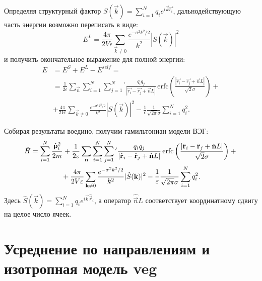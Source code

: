 Определяя структурный фактор $S (\vec{k}) = \sum_{i=1}^N q_i e^{i\vec{k} \vec{r_i}}$, дальнодействующую часть энергии возможно переписать в виде:
\begin{equation}
    \label{eq:jel:E_L_from_S}
    E^L = \frac{4\pi}{2V \epsilon} \sum_{\vec{k} \neq 0} \frac{e^{-\sigma^2 k^2 /2}}{k^2} | S (\vec{k}) |^2
\end{equation}
и получить окончательное выражение для полной энергии:
\begin{equation}
\label{eq:jel:total_energy_final}
\begin{aligned}
    E &= E^S + E^L - E^{self} = \\
    &= \frac{1}{2 \epsilon} \sum_{\vec{n}} \sum_{i=1}^N \sum_{j=1}^N {}^\prime \frac{q_i q_j}{|\vec{r_i} - \vec{r_j} + \vec{n}L|}\, \mathrm{erfc} \left( \frac{ |\vec{r_i} - \vec{r_j} + \vec{n}L| }{ \sqrt{2} \sigma } \right) + \\
    &+ \frac{4\pi}{2V \epsilon} \sum_{\vec{k} \neq 0} \frac{e^{-\sigma^2 k^2 / 2}}{k^2} | S (\vec{k}) |^2 - \frac{1}{\epsilon} \frac{1}{\sqrt{2\pi} \sigma} \sum_{i=1}^N q_i^2.
\end{aligned}
\end{equation}

Собирая результаты воедино, получим гамильтониан модели ВЭГ:
\begin{multline}
    \label{eq:jel:ham_final}
        \hat{H} = \sum\limits_{i=1}^{N} \cfrac{\hat{\vec{p}}_{i}^2}{2m}\, +
        \frac{1}{2 \epsilon} \sum_{\vec{n}} \sum_{i=1}^N \sum_{j=1}^N {}^\prime \frac{q_i q_j}{|\hat{\vec{r}}_i - \hat{\vec{r}}_j + \hat{\vec{n}}L|}\, \mathrm{erfc} \left( \frac{ |\hat{\vec{r}}_i - \hat{\vec{r}}_j + \hat{\vec{n}}L| }{ \sqrt{2} \sigma } \right) + {} \\
        {} + \frac{4\pi}{2V \epsilon} \sum_{\vec{k} \neq 0} \frac{e^{-\sigma^2 k^2 / 2}}{k^2} | \hat{S} (\vec{k}) |^2 - \frac{1}{\epsilon} \frac{1}{\sqrt{2\pi} \sigma} \sum_{i=1}^N q_i^2.
\end{multline}
Здесь $\hat{S} (\vec{k}) = \sum\limits_{i=1}^{N} q_{i} e^{i \vec{k} \hat{\vec{r}}_{i}}$, а оператор $\hat{\vec{n}}L$ соответствует координатному сдвигу на целое число ячеек.

\section{Усреднение по направлениям и изотропная модель \texorpdfstring{\acrshort{veg}}{ВЭГ}}

